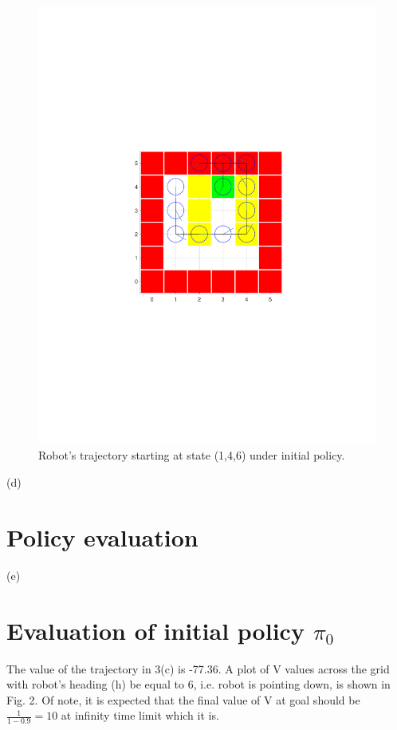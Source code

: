 \documentclass{article}
\begin{document}
	\begin{figure}[h!]
		\centering
		\includegraphics[trim={5cm 9cm 5cm 5cm},clip,scale = 1]{plots/PolicyIteration/3c.pdf}
		\caption{Robot's trajectory starting at state (1,4,6) under initial policy.}
	\end{figure}

	\newpage
	(d) 	
	\section*{Policy evaluation}
	
	
	\newpage
	(e) 
	\section*{Evaluation of initial policy $\pi_{0}$}
	The value of the trajectory in 3(c) is -77.36. A plot of V values across the grid with robot's heading (h) be equal to 6, i.e. robot is pointing down, is shown in Fig. 2. Of note, it is expected that the final value of V at goal should be $\frac{1}{1-0.9} = 10$ at infinity time limit which it is.
	
\end{document}
